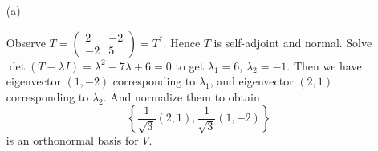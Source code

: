 \begin{Exercise}
	\begin{enumerate}[(a)]
		\item[(a)]
		\begin{solution}
			Observe $T = \begin{pmatrix}
			2 & -2 \\
			-2 & 5
			\end{pmatrix} = T^*$. Hence $T$ is self-adjoint and normal. Solve $\det(T - \lambda I) = \lambda^2-7\lambda+6 = 0$ to get $\lambda_1 = 6$, $\lambda_2 = -1$. Then we have eigenvector $(1,-2)$ corresponding to $\lambda_1$, and eigenvector $(2,1)$ corresponding to $\lambda_2$. And normalize them to obtain $$
			\left\{\frac{1}{\sqrt{3}}(2,1),\frac{1}{\sqrt{3}}(1,-2)\right\}
			$$
			is an orthonormal basis for $V$.
		\end{solution}
	\end{enumerate}
\end{Exercise}